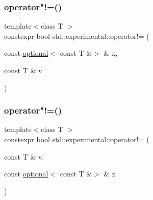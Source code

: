 \mbox{\label{namespacestd_1_1experimental_a007e24ca3b589918778709281a5611d7}} 
\subsubsection{\texorpdfstring{operator"!=()}{operator!=()}\hspace{0.1cm}{\footnotesize\ttfamily [8/9]}}
{\footnotesize\ttfamily template$<$class T $>$ \\
constexpr bool std\+::experimental\+::operator!= (\begin{DoxyParamCaption}\item[{const \mbox{\hyperlink{classstd_1_1experimental_1_1optional}{optional}}$<$ const T \&$>$ \&}]{x,  }\item[{const T \&}]{v }\end{DoxyParamCaption})}

\mbox{\label{namespacestd_1_1experimental_ab5a8b15ec09913c93bac27399f0cba38}} 
\subsubsection{\texorpdfstring{operator"!=()}{operator!=()}\hspace{0.1cm}{\footnotesize\ttfamily [9/9]}}
{\footnotesize\ttfamily template$<$class T $>$ \\
constexpr bool std\+::experimental\+::operator!= (\begin{DoxyParamCaption}\item[{const T \&}]{v,  }\item[{const \mbox{\hyperlink{classstd_1_1experimental_1_1optional}{optional}}$<$ const T \&$>$ \&}]{x }\end{DoxyParamCaption})}

\mbox{\label{namespacestd_1_1experimental_a27caacd2780817469b565c269933185d}} 
